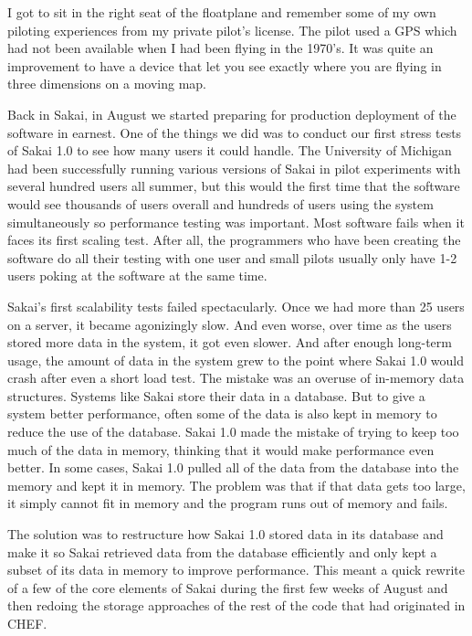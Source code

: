 \documentclass[12pt]{book}
\begin{document}
I got to sit in the right seat of the floatplane and remember 
some of my own piloting experiences from my private pilot's license.   
The pilot used a GPS which had not been available when I had 
been flying in the 1970's.  It was quite an improvement to have a 
device that let you see exactly where you are flying in three 
dimensions on a moving map.

Back in Sakai, in August we started preparing for production deployment
of the software in earnest.  One of the things
we did was to conduct our first stress tests
of Sakai 1.0 to see how many users it could handle.
The University of Michigan had been successfully running various
versions of Sakai in pilot experiments with several
hundred users all summer, but this would
the first time that the software would see
thousands of users overall and hundreds of users
using the system simultaneously so performance testing
was important.
Most software fails when it faces its first scaling
test.  After all, the programmers who have been creating
the software do all their testing with one user
and small pilots usually only have 1-2 users poking
at the software at the same time.

Sakai's first scalability tests failed spectacularly.
Once we had more than 25 users on a server, it became
agonizingly slow.  And even worse, over time
as the users stored more data in the system, it got
even slower.  And after enough long-term usage, the
amount of data in the system grew to the point where
Sakai 1.0 would crash after even a short load test.
The mistake was an overuse of in-memory data
structures.  Systems like Sakai store their data
in a database.  But to give a system better
performance, often some of the data is also kept
in memory to reduce the use of the database.
Sakai 1.0 made the mistake of trying to keep
too much of the data in memory, thinking that
it would make performance even better.
In some cases, Sakai 1.0 pulled all of the
data from the database into the memory
and kept it in memory.  The problem was that if
that data gets too large, it simply cannot fit
in memory and the program runs out of memory
and fails.

The solution was to restructure how Sakai 1.0
stored data in its database and make it so
Sakai retrieved data from the database efficiently
and only kept a subset of its data in memory
to improve performance.  This meant a quick
rewrite of a few of the core elements of Sakai
during the first few weeks of August and then
redoing the storage approaches of the rest of
the code that had originated in CHEF.
\end{document}
